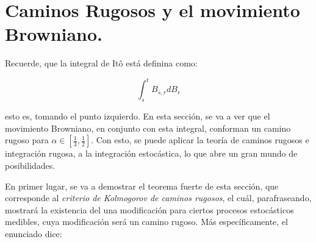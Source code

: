 





\section{Caminos Rugosos y el movimiento Browniano.}

Recuerde, que la integral de Itô está definina como:

\[
	\int_s^t B_{s,r} dB_r
\]
 
esto es, tomando el punto izquierdo. En esta sección, se va a ver que el movimiento Browniano, en conjunto con esta integral, conforman un camino rugoso para $\alpha \in \left[\frac{1}{3}, \frac{1}{2} \right]$. Con esto, se puede aplicar la teoría de caminos rugosos e integración rugosa, a la integración estocástica, lo que abre un gran mundo de posibilidades.

En primer lugar, se va a demostrar el teorema fuerte de esta sección, que corresponde al \textit{criterio de Kolmogorov de caminos rugosos}, el cuál, parafraseando, mostrará la existencia del una modificación para ciertos procesos estocásticos medibles, cuya modificación será un camino rugoso. Más específicamente, el enunciado dice:

